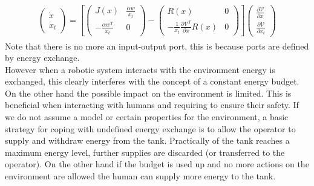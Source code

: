 \documentclass[a4paper,twoside, openright,12pt]{report}
\begin{document}
\begin{eqnarray}
\begin{aligned}
\begin{pmatrix}
\dot{x} \\ \dot{x}_t
\end{pmatrix} =
\left[
\begin{pmatrix}
J(x) & \frac{\alpha w}{x_t} \\ -\frac{\alpha w^T}{x_t} & 0
\end{pmatrix} - 
\begin{pmatrix}
R(x) & 0 \\ -\frac{1}{x_t}\frac{\partial \mathcal{V}^T}{\partial x}R(x) & 0
\end{pmatrix}
\right]
\begin{pmatrix}
\frac{\partial \mathcal{V}}{\partial x} \\
\frac{\partial \mathcal{V}}{\partial x_t}
\end{pmatrix}
\end{aligned}
\end{eqnarray}
Note that there is no more an input-output port, this is because ports are defined by energy exchange.\\
However when a robotic system interacts with the environment energy is exchanged, this clearly interferes with the concept of a constant energy budget. On the other hand the possible impact on the environment is limited. This is beneficial when interacting with humans and requiring to ensure their safety. If we do not assume a model or certain properties for the environment, a basic strategy for coping with undefined energy exchange is to allow the operator to supply and withdraw energy from the tank. Practically of the tank reaches a maximum energy level, further supplies are discarded (or transferred to the operator). On the other hand if the budget is used up and no more actions on the environment are allowed the human can supply more energy to the tank. 
\end{document}
